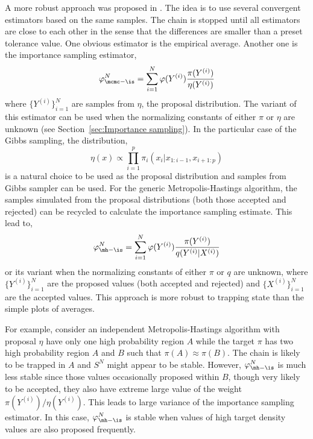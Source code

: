 A more robust approach was proposed in \cite{Robert:1995ge}. The idea is to
use several convergent estimators based on the same samples. The chain is
stopped until all estimators are close to each other in the sense that the
differences are smaller than a preset tolerance value. One obvious estimator
is the empirical average. Another one is the importance sampling estimator,
\begin{equation}
  \varphi_{\mcmc-\is}^N = \sum_{i=1}^N
  \varphi(Y^{(i)})\frac{\pi(Y^{(i)})}{\eta(Y^{(i)})}
\end{equation}
where $\{Y^{(i)}\}_{i=1}^N$ are samples from $\eta$, the proposal distribution.
The variant of this estimator can be used when the normalizing constants of
either $\pi$ or $\eta$ are unknown (see Section~\ref{sec:Importance
  sampling}). In the particular case of the Gibbs sampling, the distribution,
\begin{equation}
  \eta(x) \propto \prod_{i=1}^p \pi_i(x_i|x_{1:i-1},x_{i+1:p})
\end{equation}
is a natural choice to be used as the proposal distribution and samples from
Gibbs sampler can be used. For the generic Metropolis-Hastings algorithm, the
samples simulated from the proposal distributions (both those accepted and
rejected) can be recycled to calculate the importance sampling estimate. This
lead to,
\begin{equation}
  \varphi_{\mh-\is}^N = \sum_{i=1}^N
  \varphi(Y^{(i)})\frac{\pi(Y^{(i)})}{q(Y^{(i)}|X^{(i)})}
  \label{eq:sn is}
\end{equation}
or its variant when the normalizing constants of either $\pi$ or $q$ are
unknown, where $\{Y^{(i)}\}_{i=1}^N$ are the proposed values (both accepted
and rejected) and $\{X^{(i)}\}_{i=1}^N$ are the accepted values. This approach
is more robust to trapping state than the simple plots of averages.

For example, consider an independent Metropolis-Hastings algorithm with
proposal $\eta$ have only one high probability region $A$ while the target
$\pi$ has two high probability region $A$ and $B$ such that
$\pi(A)\approx\pi(B)$. The chain is likely to be trapped in $A$ and $S^N$
might appear to be stable. However, $\varphi_{\mh-\is}^N$ is much less stable
since those values occasionally proposed within $B$, though very likely to be
accepted, they also have extreme large value of the weight
$\pi(Y^{(i)})/\eta(Y^{(i)})$. This leads to large variance of the importance
sampling estimator. In this case, $\varphi_{\mh-\is}^N$ is stable when values
of high target density values are also proposed frequently.

